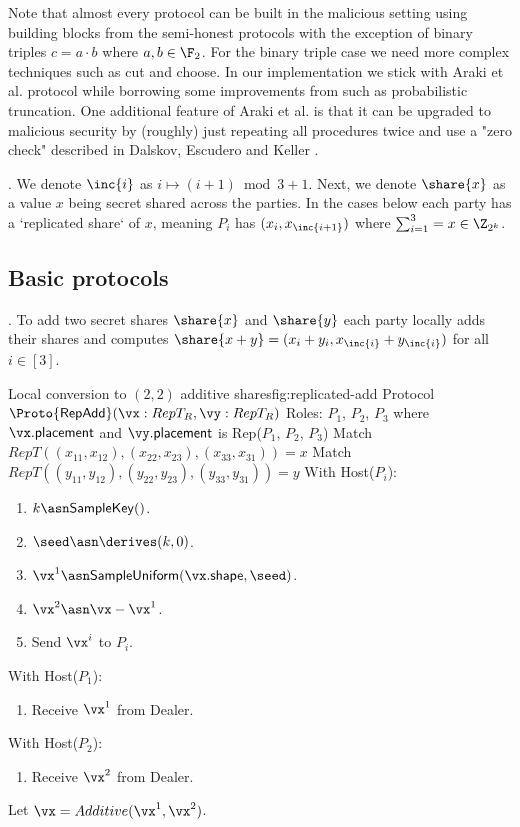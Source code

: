 Note that almost every protocol can be built in the malicious setting using
building blocks from the semi-honest protocols with the exception of binary
triples $c = a \cdot b$ where $a,b \in \F_2$. For the binary triple case we
need more complex techniques such as cut and choose. In our implementation we
stick with Araki et al. protocol \cite{CCS:AFLNO16} while borrowing some
improvements from \cite{cryptoeprint:2020:1330} such as probabilistic
truncation. One additional feature of Araki et al. \cite{CCS:AFLNO16} is that
it can be upgraded to malicious security by (roughly) just repeating all
procedures twice and use a "zero check" described in Dalskov, Escudero and
Keller \cite{cryptoeprint:2020:1330}.

. We denote $\inc{i}$ as $i \mapsto (i+1) \bmod 3 + 1$.
Next, we denote $\share{x}$ as a value $x$ being secret shared
across the parties. In the cases below each party has a `replicated share` of
$x$, meaning $P_i$ has $(x_i, x_{ \inc{i+1} })$ where $\sum_{i=1}^3 = x
\in \Z_{2^k}$.

\subsection{Basic protocols}
. To add two secret shares $\share{x}$ and $\share{y}$
each party locally adds their shares and computes $\share{x+y} =
(x_i + y_i, x_{\inc{i}} + y_{\inc{i}})$ for all $i \in [3]$.

\begin{Boxfig}{Local conversion to $(2,2)$ additive shares}{fig:replicated-add}
  {Protocol $\Proto{\mathsf{RepAdd}}(\vx: RepT_R, \vy: RepT_R)$}
  Roles: $P_1$, $P_2$, $P_3$ where $\vx.\mathsf{placement}$ and $\vy.\mathsf{placement}$ is Rep($P_1$, $P_2$, $P_3$) \newline
  Match $RepT((x_{11}, x_{12}), (x_{22}, x_{23}), (x_{33}, x_{31})) = x$ \newline
  Match $RepT((y_{11}, y_{12}), (y_{22}, y_{23}), (y_{33}, y_{31})) = y$ \newline
  With Host($P_i$):
  \begin{enumerate}
    \item $k \asn \mathsf{SampleKey}()$.
    \item $\seed \asn \derives(k, 0)$.
    \item $\vx^1 \asn \mathsf{SampleUniform}(\vx.\mathsf{shape}, \seed)$.
    \item $\vx^2 \asn \vx - \vx^1$.
    \item Send $\vx^i$ to $P_i$.
  \end{enumerate}
  With Host($P_1$):
  \begin{enumerate}
      \item Receive $\vx^1$ from Dealer.
  \end{enumerate}
  With Host($P_2$):
  \begin{enumerate}
      \item Receive $\vx^2$ from Dealer.
  \end{enumerate}
  Let $\vx = Additive(\vx^1, \vx^2)$.
\end{Boxfig}

